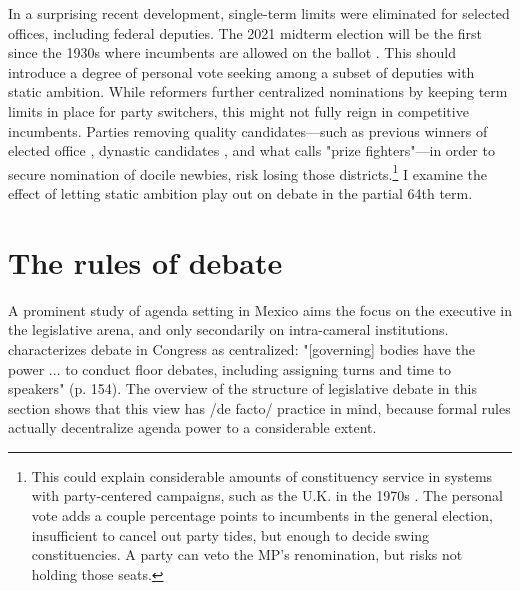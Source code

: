 \documentclass[letter,12pt]{article}
\begin{document}
In a surprising recent development, single-term limits were eliminated for selected offices, including federal deputies. The 2021 midterm election will be the first since the 1930s where incumbents are allowed on the ballot \citep[see][ for details]{magarInstReel.2017}. This should introduce a degree of personal vote seeking among a subset of deputies with static ambition. While reformers further centralized nominations by keeping term limits in place for party switchers, this might not fully reign in competitive incumbents. Parties removing quality candidates---such as previous winners of elected office \citep{jacobson.1997}, dynastic candidates \citep{enriquez-dinastias2018itam}, and what \citet{zallerprizeFighters} calls "prize fighters"---in order to secure nomination of docile newbies, risk losing those districts.\footnote{This could explain considerable amounts of constituency service in systems with party-centered campaigns, such as the U.K. in the 1970s \citep{cain.etal.1987}. The personal vote adds a couple percentage points to incumbents in the general election, insufficient to cancel out party tides, but enough to decide swing constituencies. A party can veto the MP's renomination, but risks not holding those seats.} I examine the effect of letting static ambition play out on debate in the partial 64th term. 


\section{The rules of debate} %

A prominent study of agenda setting in Mexico aims the focus on the executive in the legislative arena, and only secondarily on intra-cameral institutions. \citet{casar.agsetting.2016} characterizes debate in Congress as centralized: "[governing] bodies have the power ... to conduct floor debates, including assigning turns and time to speakers" (p. 154). The overview of the structure of legislative debate in this section shows that this view has /de facto/ practice in mind, because formal rules actually decentralize agenda power to a considerable extent. 
\end{document}
